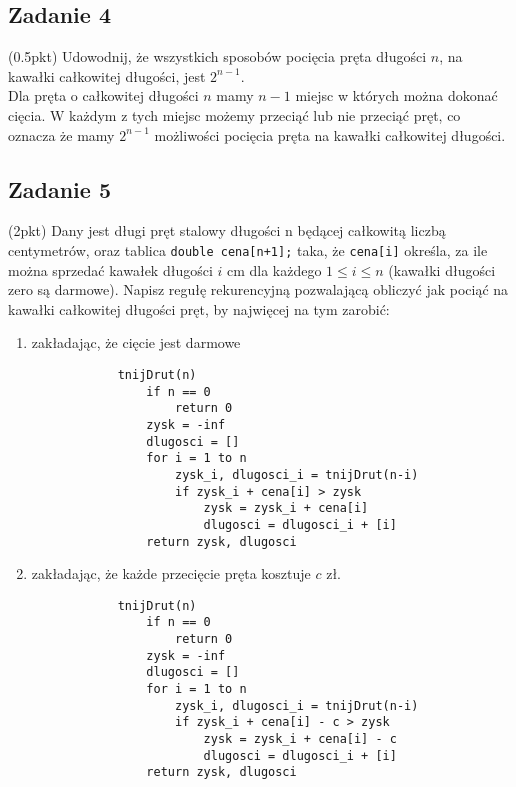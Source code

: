 \documentclass{article}
\begin{document}
\subsection*{Zadanie 4}
(0.5pkt) Udowodnij, że wszystkich sposobów pocięcia pręta długości $n$, na kawałki całkowitej długości, jest $2^{n-1}$.
\noindent \\[1em]
Dla pręta o całkowitej długości $n$ mamy $n-1$ miejsc w których można dokonać cięcia. W każdym z tych miejsc możemy
przeciąć lub nie przeciąć pręt, co oznacza że mamy $2^{n-1}$ możliwości pocięcia pręta na kawałki całkowitej długości.

\subsection*{Zadanie 5}
(2pkt) Dany jest długi pręt stalowy długości n będącej całkowitą liczbą centymetrów,
oraz tablica \verb|double cena[n+1];| taka, że \verb|cena[i]| określa, za ile można sprzedać kawałek długości $i$
cm dla każdego $1 \leq i \leq n$ (kawałki długości zero są darmowe). Napisz
regułę rekurencyjną pozwalającą obliczyć jak pociąć na kawałki całkowitej długości pręt,
by najwięcej na tym zarobić:
\begin{enumerate}[label=(\alph*)]
    \item zakładając, że cięcie jest darmowe
          \begin{lstlisting}
            tnijDrut(n)
                if n == 0
                    return 0
                zysk = -inf
                dlugosci = []
                for i = 1 to n
                    zysk_i, dlugosci_i = tnijDrut(n-i)
                    if zysk_i + cena[i] > zysk
                        zysk = zysk_i + cena[i]
                        dlugosci = dlugosci_i + [i]
                return zysk, dlugosci
          \end{lstlisting}
    \item zakładając, że każde przecięcie pręta kosztuje $c$ zł.
          \begin{lstlisting}
            tnijDrut(n)
                if n == 0
                    return 0
                zysk = -inf
                dlugosci = []
                for i = 1 to n
                    zysk_i, dlugosci_i = tnijDrut(n-i)
                    if zysk_i + cena[i] - c > zysk
                        zysk = zysk_i + cena[i] - c
                        dlugosci = dlugosci_i + [i]
                return zysk, dlugosci
          \end{lstlisting}
\end{enumerate}
\end{document}
